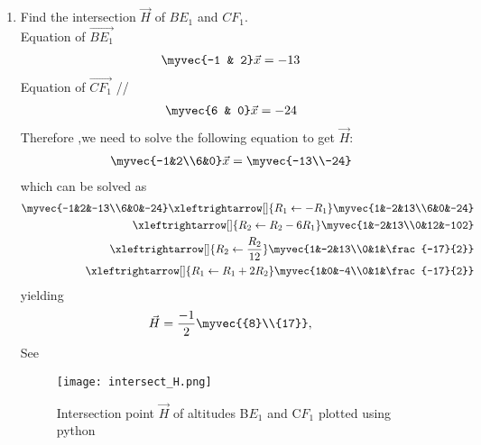 \documentclass[11pt]{book}
\begin{document}
\begin{enumerate}[label=\thesection.\arabic*.,ref=\thesection.\theenumi]
\item Find the intersection $\vec{H}$ of $BE_1$ and $CF_1$.
 \\  \solution Equation of $\vec{BE_1}$ \\
\begin{align}
    \myvec{-1 & 2}\vec{x}&= -13
\end{align}
Equation of $\vec{CF_1}$ //
\begin{align}
    \myvec{6 & 0}\vec{x}&=-24
\end{align}
Therefore ,we need to solve the following equation to get $\vec{H}:$ \\
\begin{align}
        \myvec{-1&2\\6&0} \vec{x} &= \myvec{-13\\-24}
\end{align}
%
which can be solved as 
%
\begin{align}
        \myvec{-1&2&-13\\6&0&-24}
	 \xleftrightarrow[]{R_1 \leftarrow - R_1}
        \myvec{1&-2&13\\6&0&-24}\\
	 \xleftrightarrow[]{R_2 \leftarrow R_2-6R_1}
        \myvec{1&-2&13\\0&12&-102} \\
	 \xleftrightarrow[]{R_2 \leftarrow \frac{R_2}{12}}
        \myvec{1&-2&13\\0&1&\frac{-17}{2}} \\
         \xleftrightarrow[]{R_1 \leftarrow R_1+2R_2}
        \myvec{1&0&-4\\0&1&\frac{-17}{2}}
\end{align}
%
yielding
%
\begin{align}
        \vec{H}&=\frac{-1}{2}\myvec{{8}\\{17}}
		\label{eq:geo-alt-H},
\end{align}
%
See 
\begin{figure}[H]
\centering
\texttt{[image: intersect\_H.png]}
\caption{Intersection point $\vec{H}$ of altitudes B$E_{1}$ and C$F_{1}$ plotted using python}
\label{fig:m_tri_py}
\end{figure}


\end{enumerate}
\end{document}
